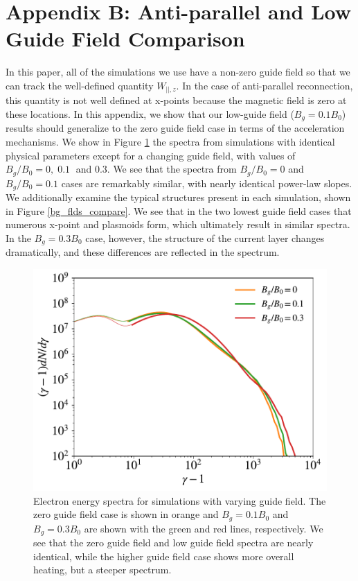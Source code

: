 \documentclass[iop,twocolappendix]{emulateapj}
\begin{document}
\section{Appendix B: Anti-parallel and Low Guide Field Comparison}
In this paper, all of the simulations we use have a non-zero guide field so that we can track the well-defined quantity $W_{||,z}$.  In the case of anti-parallel reconnection, this quantity is not well defined at x-points because the magnetic field is zero at these locations.  In this appendix, we show that our low-guide field ($B_{g}=0.1B_{0}$) results should generalize to the zero guide field case in terms of the acceleration mechanisms.  We show in Figure \ref{bg_spec_compare} the spectra from simulations with identical physical parameters except for a changing guide field, with values of $B_{g}/B_{0}=0, \; 0.1\; $ and $0.3$.  We see that the spectra from $B_{g}/B_{0}=0$ and $B_{g}/B_{0}=0.1$ cases are remarkably similar, with nearly identical power-law slopes.  We additionally examine the typical structures present in each simulation, shown in Figure \ref{bg_flds_compare}.  We see that in the two lowest guide field cases that numerous x-point and plasmoids form, which ultimately result in similar spectra.  In the $B_{g}=0.3B_{0}$ case, however, the structure of the current layer changes dramatically, and these differences are reflected in the spectrum.

\begin{figure}[htp] 
	\includegraphics[width=\linewidth]{bg_spec_compare.pdf}
	\caption{Electron energy spectra for simulations with varying guide field.  The zero guide field case is shown in orange and $B_{g}=0.1B_{0}$ and $B_{g}=0.3B_{0}$ are shown with the green and red lines, respectively.  We see that the zero guide field and low guide field spectra are nearly identical, while the higher guide field case shows more overall heating, but a steeper spectrum.}
	\label{bg_spec_compare}
\end{figure}
\end{document}
